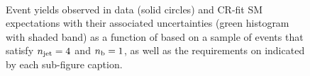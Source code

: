 \begin{figure}[h!]
\begin{center}
    \\
    \caption{Event yields observed in data (solid circles) and CR-fit SM expectations with their associated uncertainties (green histogram with shaded band) as a function of \HTmiss based on a sample of events that satisfy $n_{\text{jet}} = 4$ and $n_{\text{b}} = 1$, as well as the requirements on \scalht indicated by each sub-figure caption. }
    \label{fig:mhtdim_eq4j_eq1b}
  \end{center}
\end{figure}

